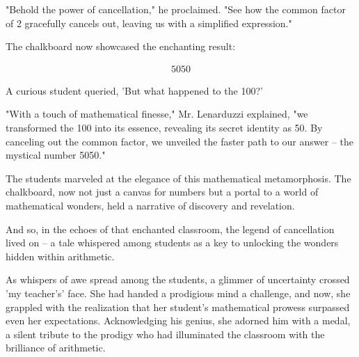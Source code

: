 \documentclass[12pt,a4paper]{article}
\begin{document}
"Behold the power of cancellation," he proclaimed. "See how the common factor of 2 gracefully cancels out, leaving us with a simplified expression."

The chalkboard now showcased the enchanting result:

\begin{align*}
    \boxed{5050}
\end{align*}

A curious student queried, 'But what happened to the 100?'

"With a touch of mathematical finesse," Mr. Lenarduzzi explained, "we transformed the 100 into its essence, revealing its secret identity as 50. By canceling out the common factor, we unveiled the faster path to our answer – the mystical number 5050."

The students marveled at the elegance of this mathematical metamorphosis. The chalkboard, now not just a canvas for numbers but a portal to a world of mathematical wonders, held a narrative of discovery and revelation.

And so, in the echoes of that enchanted classroom, the legend of cancellation lived on – a tale whispered among students as a key to unlocking the wonders hidden within arithmetic.

As whispers of awe spread among the students, a glimmer of uncertainty crossed 'my teacher's' face. She had handed a prodigious mind a challenge, and now, she grappled with the realization that her student's mathematical prowess surpassed even her expectations. Acknowledging his genius, she adorned him with a medal, a silent tribute to the prodigy who had illuminated the classroom with the brilliance of arithmetic.
\end{document}
